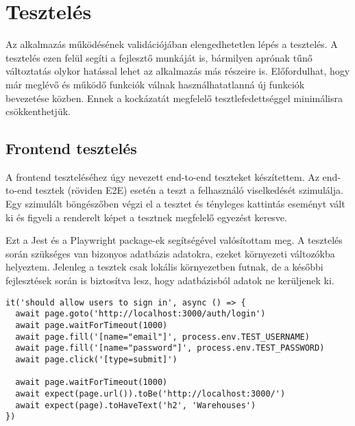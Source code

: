\chapter{Tesztelés}

Az alkalmazás működésének validációjában elengedhetetlen lépés a tesztelés.
A tesztelés ezen felül segíti a fejlesztő munkáját is, bármilyen aprónak tűnő változtatás olykor hatással lehet az alkalmazás más részeire is.
Előfordulhat, hogy már meglévő és működő funkciók válnak használhatatlanná új funkciók bevezetése közben.
Ennek a kockázatát megfelelő tesztlefedettséggel minimálisra csökkenthetjük.

\section{Frontend tesztelés}

A frontend teszteléséhez úgy nevezett end-to-end teszteket készítettem.
Az end-to-end tesztek (röviden E2E) esetén a teszt a felhasználó viselkedését szimulálja.
Egy szimulált böngészőben végzi el a tesztet és tényleges kattintás eseményt vált ki és figyeli a renderelt képet a tesztnek megfelelő egyezést keresve.

Ezt a Jest és a Playwright package-ek segítségével valósítottam meg.
A tesztelés során szükséges van bizonyos adatbázis adatokra, ezeket környezeti változókba helyeztem.
Jelenleg a tesztek csak lokális környezetben futnak, de a későbbi fejlesztések során is biztosítva lesz, hogy adatbázisból adatok ne kerüljenek ki.


\begin{lstlisting}[style=ES6, caption={Bejelentkezés E2E teszt}]
it('should allow users to sign in', async () => {
  await page.goto('http://localhost:3000/auth/login')
  await page.waitForTimeout(1000)
  await page.fill('[name="email"]', process.env.TEST_USERNAME)
  await page.fill('[name="password"]', process.env.TEST_PASSWORD)
  await page.click('[type=submit]')

  await page.waitForTimeout(1000)
  await expect(page.url()).toBe('http://localhost:3000/')
  await expect(page).toHaveText('h2', 'Warehouses')
})
\end{lstlisting}


